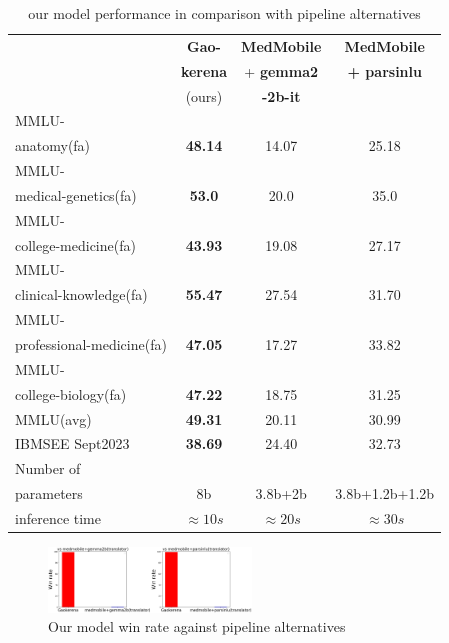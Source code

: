 \documentclass[conference]{IEEEtran}
\begin{document}
	\begin{table}[ht]
		\centering
		\caption{our model performance 
			in comparison with pipeline alternatives}
		\begin{tabular}{|l|c|c|c|}  %
			\hline
			\textbf{} & \textbf{Gao-} 
			& \textbf{MedMobile} & \textbf{MedMobile} \\ 
			& \textbf{kerena} & + \textbf{gemma2} & \textbf{+ parsinlu} \\
			& (ours)  & \textbf{-2b-it} &  \\ \hline
			MMLU- &  &  &  \\ 
			anatomy(fa)  & \textbf{48.14} & 14.07 & 25.18  \\ \hline
			MMLU- &    &  &  \\
			medical-genetics(fa) & \textbf{53.0} & 20.0 & 35.0 \\ \hline
			MMLU- &  &    &  \\
			college-medicine(fa) & \textbf{43.93} & 19.08 & 27.17 \\ \hline
			MMLU- &    &  &  \\
			clinical-knowledge(fa)& \textbf{55.47} & 27.54 & 31.70 \\ \hline
			MMLU- &  &  &  \\
			professional-medicine(fa)& \textbf{47.05} & 17.27 & 33.82 \\ \hline
			MMLU- &  &  &  \\
			college-biology(fa)& \textbf{47.22} & 18.75 & 31.25 \\ \hline
			MMLU(avg) & \textbf{49.31} & 20.11 & 30.99 \\ \hline
			IBMSEE Sept2023 & \textbf{38.69}  & 24.40 & 32.73  \\ \hline
			Number of&  &  &  \\
			parameters & 8b & 3.8b+2b & 3.8b+1.2b+1.2b \\ \hline
			inference time & $\approx 10s$ & $\approx 20s$ & $\approx 30s$ \\  \hline
		\end{tabular}
		\label{tab:model_results_on_mcqa_vs_pipeline_alternative}
	\end{table}
	
	\begin{figure}[htbp]
		\centerline{\includegraphics[width=0.48\textwidth]{fig4.png}}
		\caption{Our model win rate against pipeline alternatives}
		\label{fig4}
	\end{figure}
\end{document}
